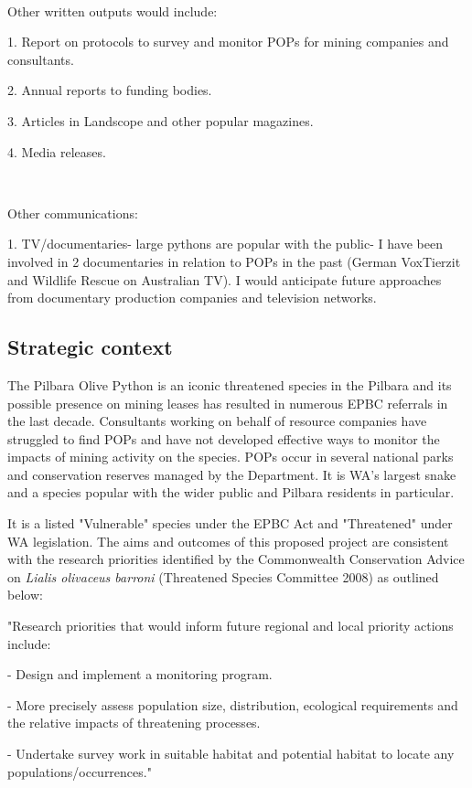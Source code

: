 \documentclass[version=last,
    paper=a4,                               %
    10pt,                                   %
    dvipsnames,
    oneside,                              %
    headings=openany,                       %
    open=any,
    BCOR=7mm,                               %
    DIV=15,     %
]{scrbook}
\begin{document}
~

Other written outputs would include:

1. Report on protocols to survey and monitor POPs for mining companies
and consultants.

2. Annual reports to funding bodies.

3. Articles in Landscope and other popular magazines.

4. Media releases.

~

Other communications:

1. TV/documentaries- large pythons are popular with the public- I have
been involved in 2 documentaries in relation to POPs in the past (German
VoxTierzit and Wildlife Rescue on Australian TV). I would anticipate
future approaches from documentary production companies and television
networks. ~




\subsection*{Strategic context}

The Pilbara Olive Python is an iconic threatened species in the Pilbara
and its possible presence on mining leases has resulted in numerous EPBC
referrals in the last decade. Consultants working on behalf of resource
companies have struggled to find POPs and have not developed effective
ways to monitor the impacts of mining activity on the species. POPs
occur in several national parks and conservation reserves managed by the
Department. It is WA's largest snake and a species popular with the
wider public and Pilbara residents in particular.

It is a listed "Vulnerable" species under the EPBC Act and "Threatened"
under WA legislation. The aims and outcomes of this proposed project are
consistent with the research priorities identified by the Commonwealth
Conservation Advice on \emph{Lialis olivaceus barroni} (Threatened
Species Committee 2008) as outlined below:

"Research priorities that would inform future regional and local
priority actions include:

- Design and implement a monitoring program.

- More precisely assess population size, distribution, ecological
requirements and the relative impacts of threatening processes.

- Undertake survey work in suitable habitat and potential habitat to
locate any populations/occurrences."
\end{document}
